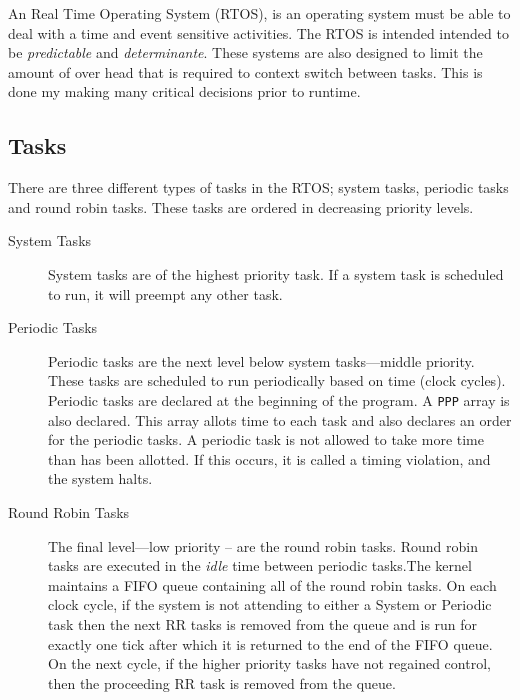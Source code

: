 

An Real Time Operating System (RTOS), is an operating system must be able to
deal with a time and event sensitive activities. The RTOS is intended intended
to be \textit{predictable} and \textit{determinante}\cite{RTOSMantis}. These
systems are also designed to limit the amount of over head that is required to
context switch between tasks. This is done my making many critical decisions
prior to runtime.



\subsection{Tasks}

There are three different types of tasks in the RTOS; system tasks, periodic tasks and round robin tasks. These tasks are ordered in decreasing priority levels.

\begin{description}
    \item[System Tasks]
    System tasks are of the highest priority task. If a system task is
    scheduled to run, it will preempt any other task.

    \item[Periodic Tasks]
    Periodic tasks are the next level below system tasks---middle priority.
    These tasks are scheduled to run periodically based on time (clock cycles).
    Periodic tasks are declared at the beginning of the program. A \texttt{PPP}
    array is also declared. This array allots time to each task and also
    declares an order for the periodic tasks. A periodic task is not allowed to
    take more time than has been allotted.  If this occurs, it is called a
    timing violation, and the system halts.

    \item[Round Robin Tasks]
    The final level---low priority -- are the round robin tasks. Round robin tasks
    are executed in the \textit{idle} time between periodic tasks.The kernel
    maintains a FIFO queue containing all of the round robin tasks. On each clock
    cycle, if the system is not attending to either a System or Periodic task then
    the next RR tasks is removed from the queue and is run for exactly one tick
    after which it is returned to the end of the FIFO queue. On the next cycle, if
    the higher priority tasks have not regained control, then the proceeding RR
    task is removed from the queue.  
\end{description}



